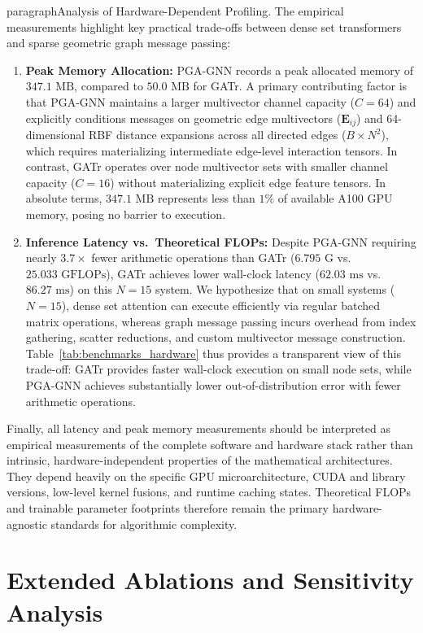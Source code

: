 \documentclass[10pt]{article}
\begin{document}
paragraph{Analysis of Hardware-Dependent Profiling.}
The empirical measurements highlight key practical trade-offs between dense set transformers and sparse geometric graph message passing:
\begin{enumerate}
    \item \textbf{Peak Memory Allocation:} PGA-GNN records a peak allocated memory of $347.1\text{ MB}$, compared to $50.0\text{ MB}$ for GATr. A primary contributing factor is that PGA-GNN maintains a larger multivector channel capacity ($C=64$) and explicitly conditions messages on geometric edge multivectors ($\mathbf{E}_{ij}$) and 64-dimensional RBF distance expansions across all directed edges ($B \times N^2$), which requires materializing intermediate edge-level interaction tensors. In contrast, GATr operates over node multivector sets with smaller channel capacity ($C=16$) without materializing explicit edge feature tensors. In absolute terms, $347.1\text{ MB}$ represents less than $1\%$ of available A100 GPU memory, posing no barrier to execution.
    \item \textbf{Inference Latency vs.\ Theoretical FLOPs:} Despite PGA-GNN requiring nearly $3.7\times$ fewer arithmetic operations than GATr ($6.795\text{ G}$ vs.\ $25.033\text{ GFLOPs}$), GATr achieves lower wall-clock latency ($62.03\text{ ms}$ vs.\ $86.27\text{ ms}$) on this $N=15$ system. We hypothesize that on small systems ($N=15$), dense set attention can execute efficiently via regular batched matrix operations, whereas graph message passing incurs overhead from index gathering, scatter reductions, and custom multivector message construction. Table~\ref{tab:benchmarks_hardware} thus provides a transparent view of this trade-off: GATr provides faster wall-clock execution on small node sets, while PGA-GNN achieves substantially lower out-of-distribution error with fewer arithmetic operations.
\end{enumerate}

Finally, all latency and peak memory measurements should be interpreted as empirical measurements of the complete software and hardware stack rather than intrinsic, hardware-independent properties of the mathematical architectures. They depend heavily on the specific GPU microarchitecture, CUDA and library versions, low-level kernel fusions, and runtime caching states. Theoretical FLOPs and trainable parameter footprints therefore remain the primary hardware-agnostic standards for algorithmic complexity.


\section{Extended Ablations and Sensitivity Analysis}
\label{app:ablations}
\end{document}

